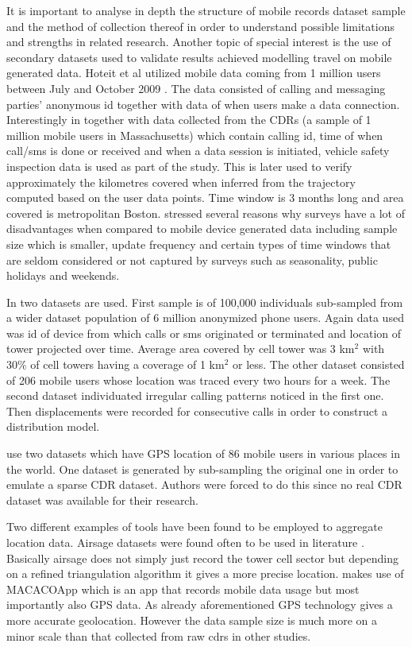 \documentclass[12pt, a4paper]{report}
\theoremstyle{definition}
\theoremstyle{definition}%
\theoremstyle{definition}%
\theoremstyle{definition}%
\theoremstyle{definition}%
\theoremstyle{definition}%
\begin{document}
It is important to analyse in depth the structure of mobile records dataset sample and the method of collection thereof in order to understand possible limitations and strengths in related research. Another topic of special interest is the use of secondary datasets used to validate results achieved modelling travel on mobile generated data. Hoteit et al utilized mobile data coming from 1 million users between July and October 2009 \cite{Hoteit2014}. The data consisted of calling and messaging parties' anonymous id together with data of when users make a data connection. Interestingly in \cite{Calabrese2013} together with data collected from the CDRs (a sample of 1 million mobile users in Massachusetts) which contain calling id, time of when call/sms is done or received and when a data session is initiated, vehicle safety inspection data is used as part of the study. This is later used to verify approximately the kilometres covered when inferred from the trajectory computed based on the user data points. Time window is 3 months long and area covered is metropolitan Boston.  \cite{Calabrese2013,Colak2015} stressed several reasons why surveys have a lot of disadvantages when compared to mobile device generated data including sample size which is smaller, update frequency and certain types of time windows that are seldom considered or not captured by surveys such as seasonality, public holidays and weekends.   

In \cite{Gonzalez2008} two datasets are used. First sample is of 100,000 individuals sub-sampled from a wider dataset population of 6 million anonymized  phone users. Again data used was id of device from which calls or sms originated or terminated and location of tower projected over time. Average area covered by cell tower was 3 km$^{2}$ with 30\% of cell towers having a coverage of 1 km$^{2}$ or less. The other dataset consisted of 206 mobile users whose location was traced every two hours for a week. The second dataset individuated irregular calling patterns noticed in the first one. Then displacements were recorded for consecutive calls in order to construct a distribution model.

\cite{Hoteit2016} use two datasets which have GPS location of 86 mobile users in various places in the world. One dataset is generated by sub-sampling the original one in order to emulate a sparse CDR dataset. Authors were forced to do this since no real CDR dataset was available for their research.  

Two different examples of tools have been found to be employed to aggregate location data. Airsage datasets were found often to be used in literature \cite{Hoteit2014, Wang2013, Calabrese2013,Leduc2008,Wang2012, Colak2015}. Basically airsage does not simply just record the tower cell sector but depending on a refined triangulation algorithm it gives a more precise location.  \cite{Hoteit2016} makes use of MACACOApp which is an app that records mobile data usage but most importantly also GPS data. As already aforementioned GPS technology gives a more accurate geolocation. However the data sample size is much more on a minor scale than that collected from raw cdrs in other studies.
\end{document}
